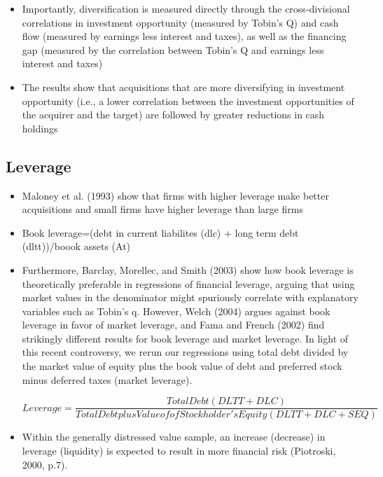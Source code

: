 \documentclass[12pt]{article}
\begin{document}
    \begin{itemize}
        \item Importantly, diversification is measured directly through the cross-divisional correlations in investment opportunity (measured by Tobin’s Q) and cash flow (measured by earnings less interest and taxes), as well as the financing gap (measured by the correlation between Tobin’s Q and earnings less interest and taxes) \citep{DUCHIN2010}
        \item The results show that acquisitions that are more diversifying in investment opportunity (i.e., a lower correlation between the investment opportunities of the acquirer and the target) are followed by greater reductions in cash holdings \citep{DUCHIN2010}
    \end{itemize}


\subsection{Leverage}

    \begin{itemize}
        \item Maloney et al. (1993) show that firms with higher leverage make better acquisitions and small firms have higher leverage than large firms \citep{Moeller2004}  
        
        \item Book leverage=(debt in current liabilites (dlc) + long term debt (dltt))/boook assets (At) \citep{DUCHIN2010}

        \item Furthermore, Barclay, Morellec, and Smith (2003) show how book leverage is theoretically preferable in regressions of financial leverage, arguing that using market values in the denominator might spuriously correlate with explanatory variables such as Tobin’s q. However, Welch (2004) argues against book leverage in favor of market leverage, and Fama and French (2002) find strikingly different results for book leverage and market leverage. In light of this recent controversy, we rerun our regressions using total debt divided by the market value of equity plus the book value of debt and preferred stock minus deferred taxes (market leverage). \citep{MacKay2005}

        \begin{displaymath}
            Leverage = \frac{Total Debt (DLTT+DLC)}{Total Debt plus Value of of Stockholder's Equity (DLTT+DLC+SEQ)}
        \end{displaymath}

        \item Within the generally distressed value sample, an increase (decrease) in leverage (liquidity) is expected to result in more financial risk (Piotroski, 2000, p.7). \citep{Mohr2012}
    \end{itemize}
\end{document}
